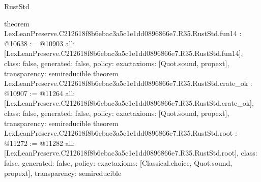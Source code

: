 \begin{lexlean}{RustStd}
\begin{coremodule}
{}
theorem LexLeanPreserve.C212618f8b6ebac3a5c1e1dd0896866e7.R35.RustStd.fun14 : @10638 := @10903 {
  all: [LexLeanPreserve.C212618f8b6ebac3a5c1e1dd0896866e7.R35.RustStd.fun14],
  class: false,
  generated: false,
  policy: exact{axioms: [Quot.sound, propext]},
  transparency: semireducible
}
theorem LexLeanPreserve.C212618f8b6ebac3a5c1e1dd0896866e7.R35.RustStd.crate_ok : @10907 := @11264 {
  all: [LexLeanPreserve.C212618f8b6ebac3a5c1e1dd0896866e7.R35.RustStd.crate_ok],
  class: false,
  generated: false,
  policy: exact{axioms: [Quot.sound, propext]},
  transparency: semireducible
}
theorem LexLeanPreserve.C212618f8b6ebac3a5c1e1dd0896866e7.R35.RustStd.root : @11272 := @11282 {
  all: [LexLeanPreserve.C212618f8b6ebac3a5c1e1dd0896866e7.R35.RustStd.root],
  class: false,
  generated: false,
  policy: exact{axioms: [Classical.choice, Quot.sound, propext]},
  transparency: semireducible
}


\end{coremodule}
\end{lexlean}

